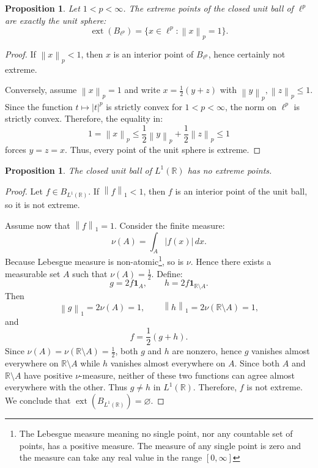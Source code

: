 \documentclass[reqno]{amsart}
\newtheorem{proposition}[theorem]{Proposition}
\theoremstyle{definition}
\newcommand{\norm}[1]{\left\lVert #1 \right\rVert}
\newcommand{\abs}[1]{\left\lvert #1 \right\rvert}
\newcommand{\ext}{\operatorname{ext}}
\begin{document}
\begin{proposition}\label{prop:lp}
Let $1 < p < \infty$. The extreme points of the closed unit ball of $\ell^p$ are exactly the unit sphere:
\begin{equation}
    \ext(B_{\ell^p}) = \{x \in \ell^p : \norm{x}_p = 1\}.
\end{equation}
\end{proposition}

\begin{proof}
If $\norm{x}_p < 1$, then $x$ is an interior point of $B_{\ell^p}$, hence certainly not extreme.

Conversely, assume $\norm{x}_p = 1$ and write $x = \frac12(y+z)$ with
$\norm{y}_p, \norm{z}_p \le 1$. Since the function $t \mapsto \abs{t}^p$ is strictly convex for
$1 < p < \infty$, the norm on $\ell^p$ is strictly convex. Therefore, the equality in:
\begin{equation*}
    1 = \norm{x}_p \le \frac12\norm{y}_p + \frac12\norm{z}_p \le 1
\end{equation*}
forces $y = z = x$. Thus, every point of the unit sphere is extreme.
\end{proof}

\begin{proposition}\label{prop:l1R}
The closed unit ball of $L^1(\mathbb{R})$ has no extreme points.
\end{proposition}

\begin{proof}
Let $f \in B_{L^1(\mathbb{R})}$. If $\norm{f}_1 < 1$, then $f$ is an interior point of the unit ball,
so it is not extreme.

Assume now that $\norm{f}_1 = 1$. Consider the finite measure:
\begin{equation*}
    \nu(A) = \int_A \abs{f(x)}\,dx.
\end{equation*}
Because Lebesgue measure is non-atomic\footnote{The Lebesgue measure meaning no single point, nor any countable set of points, has a positive measure. The measure of any single point is zero and the measure can take any real value in the range $[0, \infty]$}, so is $\nu$. Hence there exists a measurable set $A$
such that $\nu(A) = \frac12$. Define:
\begin{equation*}
    g = 2f\mathbf{1}_A, \qquad h = 2f\mathbf{1}_{\mathbb{R} \setminus A}.
\end{equation*}
Then
\begin{equation*}
    \norm{g}_1 = 2\nu(A) = 1, \qquad \norm{h}_1 = 2\nu(\mathbb{R} \setminus A) = 1,
\end{equation*}
and
\begin{equation*}
    f = \frac12(g+h).
\end{equation*}
Since $\nu(A) = \nu(\mathbb{R} \setminus A) = \frac12$, both $g$ and $h$ are nonzero, hence
$g$ vanishes almost everywhere on $\mathbb{R} \setminus A$ while $h$ vanishes almost everywhere on $A$. Since both $A$ and $\mathbb{R} \setminus A$ have positive $\nu$-measure, neither of these two functions can agree almost everywhere with the other. Thus $g \neq h$ in $L^1(\mathbb{R})$. Therefore, $f$ is not extreme. We conclude that $\ext(B_{L^1(\mathbb{R})}) = \varnothing$.
\end{proof}
\end{document}
